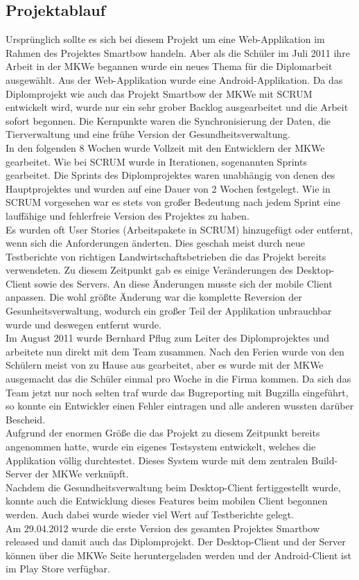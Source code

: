 \subsection{Projektablauf}
Ursprünglich sollte es sich bei diesem Projekt um eine Web-Applikation im Rahmen des Projektes Smartbow handeln. Aber als die Schüler im Juli 2011 ihre Arbeit in der MKWe begannen wurde ein neues Thema für die Diplomarbeit ausgewählt. Aus der Web-Applikation wurde eine Android-Applikation. Da das Diplomprojekt wie auch das Projekt Smartbow der MKWe mit SCRUM entwickelt wird, wurde nur ein sehr grober Backlog ausgearbeitet und die Arbeit sofort begonnen. Die Kernpunkte waren die Synchronisierung der Daten, die Tierverwaltung und eine frühe Version der Gesundheitsverwaltung.\\
In den folgenden 8 Wochen wurde Vollzeit mit den Entwicklern der MKWe gearbeitet. Wie bei SCRUM wurde in Iterationen, sogenannten Sprints gearbeitet. Die Sprints des Diplomprojektes waren unabhängig von denen des Hauptprojektes und wurden auf eine Dauer von 2 Wochen festgelegt. Wie in SCRUM vorgesehen war es stets von großer Bedeutung nach jedem Sprint eine lauffähige und fehlerfreie Version des Projektes zu haben. \\
Es wurden oft User Stories (Arbeitspakete in SCRUM) hinzugefügt oder entfernt, wenn sich die Anforderungen änderten. Dies geschah meist durch neue Testberichte von richtigen Landwirtschaftsbetrieben die das Projekt bereits verwendeten. Zu diesem Zeitpunkt gab es einige Veränderungen des Desktop-Client sowie des Servers. An diese Änderungen musste sich der mobile Client anpassen. Die wohl größte Änderung war die komplette Reversion der Gesunheitsverwaltung, wodurch ein großer Teil der Applikation unbrauchbar wurde und deswegen entfernt wurde. \\
Im  August 2011 wurde Bernhard Pflug zum Leiter des Diplomprojektes und arbeitete nun direkt mit dem Team zusammen. Nach den Ferien wurde von den Schülern meist von zu Hause aus gearbeitet, aber es wurde mit der MKWe ausgemacht das die Schüler einmal pro Woche in die Firma kommen. Da sich das Team jetzt nur noch selten traf wurde das Bugreporting mit Bugzilla eingeführt, so konnte ein Entwickler einen Fehler eintragen und alle anderen wussten darüber Bescheid.\\
Aufgrund der enormen Größe die das Projekt zu diesem Zeitpunkt bereits angenommen hatte, wurde ein eigenes Testsystem entwickelt, welches die Applikation völlig durchtestet. Dieses System wurde mit dem zentralen Build-Server der MKWe verknüpft. \\
Nachdem die Gesundheitsverwaltung beim Desktop-Client fertiggestellt wurde, konnte auch die Entwicklung dieses Features beim mobilen Client begonnen werden. Auch dabei wurde wieder viel Wert auf Testberichte gelegt. \\
Am 29.04.2012 wurde die erste Version des gesamten Projektes Smartbow released und damit auch das Diplomprojekt. Der Desktop-Client und der Server können über die MKWe Seite heruntergeladen werden und der Android-Client ist im Play Store verfügbar.
